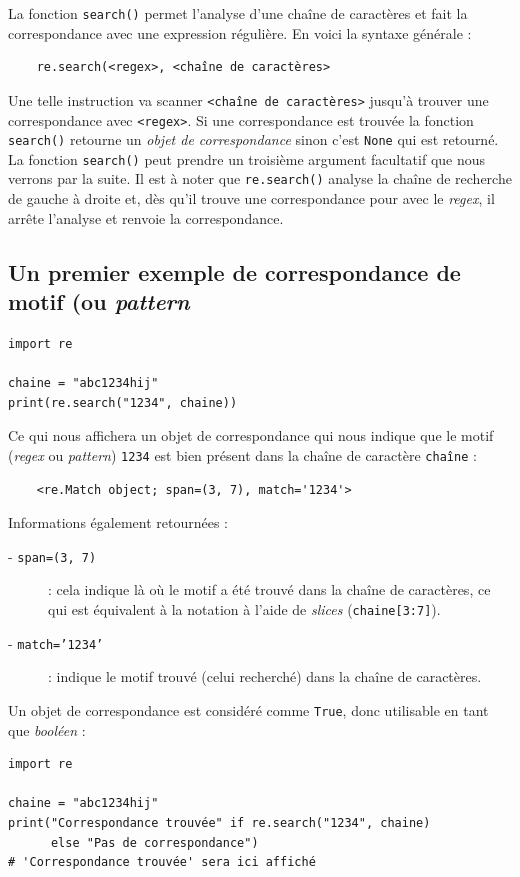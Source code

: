 \documentclass[a4paper,12pt]{book}
\begin{document}
La fonction \texttt{search()} permet l'analyse d'une chaîne de caractères et fait la correspondance avec une expression régulière. En voici la syntaxe générale :
\begin{verbatim}
    re.search(<regex>, <chaîne de caractères>
\end{verbatim}
\medskip

Une telle instruction va scanner \texttt{<chaîne de caractères>} jusqu'à trouver une correspondance avec \texttt{<regex>}. Si une correspondance est trouvée la fonction \texttt{search()} retourne un \textit{objet de correspondance} sinon c'est \texttt{None} qui est retourné. La fonction \texttt{search()} peut prendre un troisième argument facultatif que nous verrons par la suite. Il est à noter que \texttt{re.search()} analyse la chaîne de recherche de gauche à droite et, dès qu'il trouve une correspondance pour avec le \textit{regex}, il arrête l'analyse et renvoie la correspondance.
\medskip

\subsection*{Un premier exemple de correspondance de motif (ou \textit{pattern}}
\begin{lstlisting}
import re

chaine = "abc1234hij"
print(re.search("1234", chaine))
\end{lstlisting}
\medskip

Ce qui nous affichera un objet de correspondance qui nous indique que le motif (\textit{regex} ou \textit{pattern}) \texttt{1234} est bien présent dans la chaîne de caractère \texttt{chaîne} :
\begin{verbatim}
    <re.Match object; span=(3, 7), match='1234'>
\end{verbatim}
\medskip

Informations également retournées :
\begin{description}
	\item[- \texttt{span=(3, 7)}] : cela indique là où le motif a été trouvé dans la chaîne de caractères, ce qui est équivalent à la notation à l'aide de \textit{slices} (\texttt{chaine[3:7]}).
	\item[- \texttt{match='1234'}] : indique le motif trouvé (celui recherché) dans la chaîne de caractères.
\end{description}
\medskip

Un objet de correspondance est considéré comme \texttt{True}, donc utilisable en tant que \textit{booléen} :
\begin{lstlisting}
import re

chaine = "abc1234hij"
print("Correspondance trouvée" if re.search("1234", chaine) 
      else "Pas de correspondance")
# 'Correspondance trouvée' sera ici affiché
\end{lstlisting}
\medskip
\end{document}
